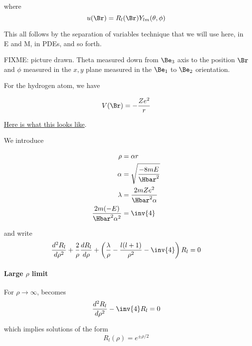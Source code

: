 where
\begin{equation}\label{eqn:PHY356FLecture10:80}
u(\Br) = R_l(\Br) Y_{lm}(\theta, \phi)
\end{equation}

This all follows by the separation of variables technique that we will use here, in E and M, in PDEs, and so forth.

FIXME: picture drawn.  Theta measured down from \(\Be_3\) axis to the position \(\Br\) and \(\phi\) measured in the \(x,y\) plane measured in the \(\Be_1\) to \(\Be_2\) orientation.

For the hydrogen atom, we have

\begin{equation}\label{eqn:PHY356FLecture10:90}
V(\Br) = - \frac{Z e^2}{r}
\end{equation}

\href{http://www.wolframalpha.com/input/?i=graph+-1/r}{Here is what this looks like}.

We introduce

\begin{align}\label{eqn:PHY356FLecture10:100}
\rho &= \alpha r \\
\alpha &= \sqrt{\frac{-8 m E}{\Hbar^2}} \\
\lambda &= \frac{2 m Z e^2}{\Hbar^2 \alpha} \\
\frac{2 m (- E) }{\Hbar^2 \alpha^2 } &= \inv{4}
\end{align}

and write
\begin{equation}\label{eqn:PHY356FLecture10:110}
\frac{d^2 R_l}{d\rho^2} + \frac{2}{\rho} \frac{d R_l}{d\rho} + \left( \frac{\lambda}{\rho} - \frac{l(l+1)}{\rho^2} - \inv{4} \right) R_l = 0
\end{equation}

\paragraph{Large \(\rho\) limit}

For \(\rho \rightarrow \infty\),  becomes
\begin{equation}\label{eqn:PHY356FLecture10:120}
\frac{d^2 R_l}{d\rho^2} - \inv{4} R_l = 0
\end{equation}

which implies solutions of the form
\begin{equation}\label{eqn:PHY356FLecture10:130}
R_l(\rho) = e^{\pm \rho/2}
\end{equation}

